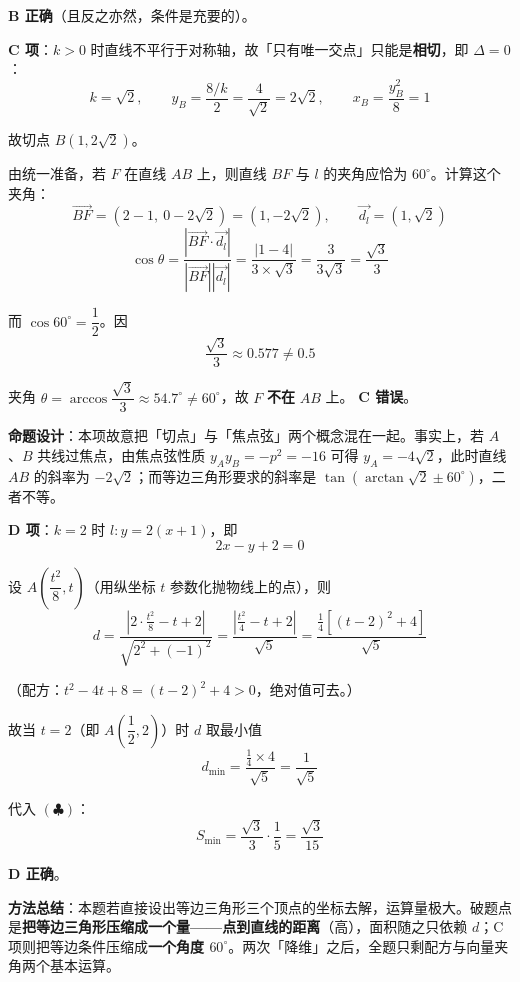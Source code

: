 \begin{answer}
 \textbf{B 正确}（且反之亦然，条件是充要的）。

\par\medskip

\textbf{C 项}：$k>0$ 时直线不平行于对称轴，故「只有唯一交点」只能是\textbf{相切}，即 $\Delta=0$：
\nopagebreak[4]
\[k=\sqrt2,\qquad y_B=\frac{8/k}{2}=\frac{4}{\sqrt2}=2\sqrt2,\qquad x_B=\frac{y_B^2}{8}=1\]

故切点 $B\left(1,2\sqrt2\right)$。

由统一准备，若 $F$ 在直线 $AB$ 上，则直线 $BF$ 与 $l$ 的夹角应恰为 $60^\circ$。计算这个夹角：
\nopagebreak[4]
\[\overrightarrow{BF}=(2-1,\ 0-2\sqrt2)=\left(1,-2\sqrt2\right),\qquad \vec{d_l}=\left(1,\sqrt2\right)\]
\nopagebreak[4]
\[\cos\theta=\frac{\left|\overrightarrow{BF}\cdot\vec{d_l}\right|}{\left|\overrightarrow{BF}\right|\left|\vec{d_l}\right|}=\frac{\left|1-4\right|}{3\times\sqrt3}=\frac{3}{3\sqrt3}=\frac{\sqrt3}{3}\]

而 $\cos60^\circ=\dfrac12$。因
\nopagebreak[4]
\[\frac{\sqrt3}{3}\approx0.577\ne0.5\]

夹角 $\theta=\arccos\dfrac{\sqrt3}{3}\approx54.7^\circ\ne60^\circ$，故 $F$ \textbf{不在} $AB$ 上。 \textbf{C 错误}。

\begin{gktip}
\textbf{命题设计}：本项故意把「切点」与「焦点弦」两个概念混在一起。事实上，若 $A$、$B$ 共线过焦点，由焦点弦性质 $y_Ay_B=-p^2=-16$ 可得 $y_A=-4\sqrt2$，此时直线 $AB$ 的斜率为 $-2\sqrt2$；而等边三角形要求的斜率是 $\tan\left(\arctan\sqrt2\pm60^\circ\right)$，二者不等。
\end{gktip}

\par\medskip

\textbf{D 项}：$k=2$ 时 $l:y=2(x+1)$，即
\nopagebreak[4]
\[2x-y+2=0\]

设 $A\left(\dfrac{t^2}{8},t\right)$（用纵坐标 $t$ 参数化抛物线上的点），则
\nopagebreak[4]
\[d=\frac{\left|2\cdot\frac{t^2}{8}-t+2\right|}{\sqrt{2^2+(-1)^2}}=\frac{\left|\frac{t^2}{4}-t+2\right|}{\sqrt5}=\frac{\frac14\left[(t-2)^2+4\right]}{\sqrt5}\]

（配方：$t^2-4t+8=(t-2)^2+4>0$，绝对值可去。）

故当 $t=2$（即 $A\left(\dfrac12,2\right)$）时 $d$ 取最小值
\nopagebreak[4]
\[d_{\min}=\frac{\frac14\times4}{\sqrt5}=\frac{1}{\sqrt5}\]

代入 $(\clubsuit)$：
\nopagebreak[4]
\[S_{\min}=\frac{\sqrt3}{3}\cdot\frac15=\frac{\sqrt3}{15}\]

 \textbf{D 正确}。

\begin{gktip}
\textbf{方法总结}：本题若直接设出等边三角形三个顶点的坐标去解，运算量极大。破题点是\textbf{把等边三角形压缩成一个量——点到直线的距离}（高），面积随之只依赖 $d$；C 项则把等边条件压缩成\textbf{一个角度 $60^\circ$}。两次「降维」之后，全题只剩配方与向量夹角两个基本运算。
\end{gktip}


\par\medskip

\end{answer}

